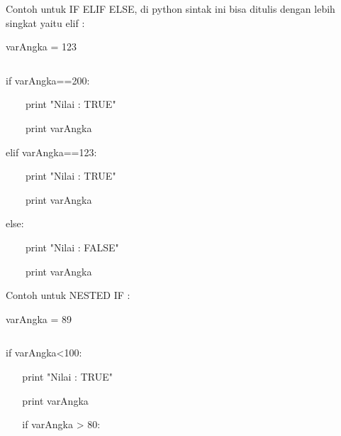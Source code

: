 \vspace{12pt}
\noindent 
Contoh untuk IF ELIF ELSE, di python sintak ini bisa ditulis dengan lebih singkat yaitu elif :  \par
\vspace{12pt}
\noindent 
varAngka = 123 \par
\noindent 
 $  $ \par
\noindent 
if varAngka==200: \par
\vspace{12pt}
\noindent 
 $  $  $  $  $  $  $  $  $  $  $  $  $  $print "Nilai : TRUE" \par
\vspace{12pt}
\noindent 
 $  $  $  $  $  $  $  $  $  $  $  $  $  $print varAngka \par
\vspace{12pt}
\noindent 
elif varAngka==123: \par
\vspace{12pt}
\noindent 
 $  $  $  $  $  $  $  $  $  $  $  $  $  $print "Nilai : TRUE" \par
\vspace{12pt}
\noindent 
 $  $  $  $  $  $  $  $  $  $  $  $  $  $print varAngka \par
\vspace{12pt}
\noindent 
else: \par
\vspace{12pt}
\noindent 
 $  $  $  $  $  $  $  $  $  $  $  $  $  $print "Nilai : FALSE" \par
\vspace{12pt}
\noindent 
 $  $  $  $  $  $  $  $  $  $  $  $  $  $print varAngka \par
\vspace{12pt}
\noindent 
Contoh untuk NESTED IF :  \par
\vspace{12pt}
\noindent 
varAngka = 89 \par
\noindent 
 $  $ \par
\noindent 
if varAngka<100: \par
\vspace{12pt}
\noindent 
 $  $  $  $  $  $  $  $  $  $  $  $print "Nilai : TRUE" \par
\vspace{12pt}
\noindent 
 $  $  $  $  $  $  $  $  $  $  $  $print varAngka \par
\vspace{12pt}
\noindent 
 $  $  $  $  $  $  $  $  $  $  $  $if varAngka > 80: \par
